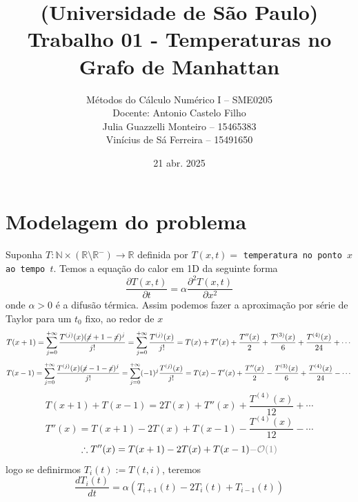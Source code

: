 \documentclass{article}
\title{(Universidade de São Paulo)\\
Trabalho 01 - Temperaturas no Grafo de Manhattan}
\author{Métodos do Cálculo Numérico I -- SME0205\\
Docente: Antonio Castelo Filho\\[.2cm]
Julia Guazzelli Monteiro -- 15465383\\
Vinícius de Sá Ferreira -- 15491650}
\date{21 abr. 2025}
\begin{document}
    \maketitle
    
    \section{Modelagem do problema}

    Suponha $T: \mathbb{N} \times (\mathbb{R} \setminus \mathbb{R}^-) \to \mathbb{R}$ definida por $T(x,t) =$ \verb|temperatura no ponto |$x$\verb| ao tempo |$t$. Temos a equação do calor em 1D da seguinte forma
    \[\frac{\partial T(x,t)}{\partial t} = \alpha \frac{\partial^2 T(x,t)}{\partial x^2}\]
    onde $\alpha > 0$ é a difusão térmica. Assim podemos fazer a aproximação por série de Taylor para um $t_0$ fixo, ao redor de $x$
    \[T(x+1) = \sum_{j=0}^{+\infty} \frac{T^{(j)}(x) (\cancel{x}+1-\cancel{x})^j}{j!} = \sum_{j=0}^{+\infty} \frac{T^{(j)}(x)}{j!} = T(x) + T'(x) + \frac{T''(x)}{2} + \frac{T^{(3)}(x)}{6} + \frac{T^{(4)}(x)}{24} + \cdots\]
    \[T(x-1) = \sum_{j=0}^{+\infty} \frac{T^{(j)}(x) (\cancel{x}-1-\cancel{x})^j}{j!} = \sum_{j=0}^{+\infty} (-1)^j\frac{T^{(j)}(x)}{j!} = T(x) - T'(x) + \frac{T''(x)}{2} - \frac{T^{(3)}(x)}{6} + \frac{T^{(4)}(x)}{24} - \cdots\]
    \[T(x+1)+T(x-1) = 2T(x) + T''(x) + \frac{T^{(4)}(x)}{12} + \cdots\]
    \[ T''(x) = T(x+1)-2T(x)+T(x-1) - \frac{T^{(4)}(x)}{12} - \cdots\]
    \[\therefore T''(x) = T(x+1)-2T(x)+T(x-1) \color{gray}{- \mathcal{O}(1)}\]
    logo se definirmos $T_i(t) := T(t,i)$, teremos
    \[\frac{dT_i(t)}{dt} = \alpha (T_{i+1}(t)-2T_i(t)+T_{i-1}(t))\]
\end{document}
